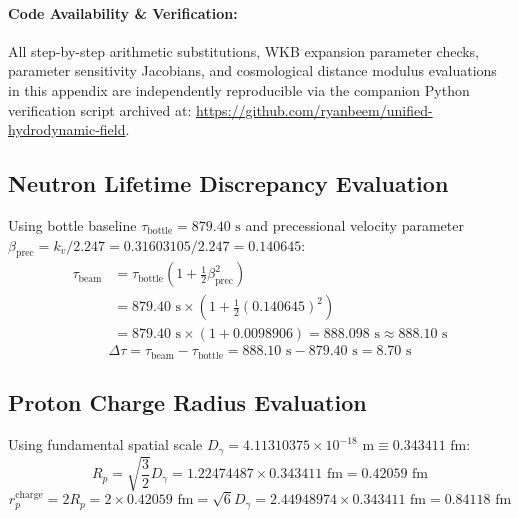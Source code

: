 \documentclass[11pt,a4paper]{article}
\begin{document}
	\paragraph{Code Availability \& Verification:}
	All step-by-step arithmetic substitutions, WKB expansion parameter checks, parameter sensitivity Jacobians, and cosmological distance modulus evaluations in this appendix are independently reproducible via the companion Python verification script archived at: \url{https://github.com/ryanbeem/unified-hydrodynamic-field}.
	
	\subsection{Neutron Lifetime Discrepancy Evaluation}
	Using bottle baseline $\tau_{\text{bottle}} = 879.40\text{ s}$ and precessional velocity parameter $\beta_{\text{prec}} = k_v / 2.247 = 0.31603105 / 2.247 = 0.140645$:
	\begin{align}
		\tau_{\text{beam}} &= \tau_{\text{bottle}} \left(1 + \frac{1}{2} \beta_{\text{prec}}^2\right) \nonumber \\
		&= 879.40\text{ s} \times \left(1 + \frac{1}{2}(0.140645)^2\right) \nonumber \\
		&= 879.40\text{ s} \times (1 + 0.0098906) = 888.098\text{ s} \approx 888.10\text{ s}
	\end{align}
	\begin{equation}
		\Delta\tau = \tau_{\text{beam}} - \tau_{\text{bottle}} = 888.10\text{ s} - 879.40\text{ s} = 8.70\text{ s}
	\end{equation}
	
	\subsection{Proton Charge Radius Evaluation}
	Using fundamental spatial scale $D_\gamma = 4.11310375 \times 10^{-18}\text{ m} \equiv 0.343411\text{ fm}$:
	\begin{equation}
		R_p = \sqrt{\frac{3}{2}} D_\gamma = 1.22474487 \times 0.343411\text{ fm} = 0.42059\text{ fm}
	\end{equation}
	\begin{equation}
		r_p^{\text{charge}} = 2 R_p = 2 \times 0.42059\text{ fm} = \sqrt{6} D_\gamma = 2.44948974 \times 0.343411\text{ fm} = 0.84118\text{ fm}
	\end{equation}
	
\end{document}
